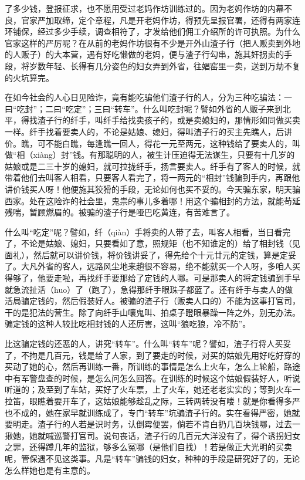 \documentclass[12pt,UTF8]{ctexbook}
\begin{document}
了多少钱，登报征求，也不愿用受过老妈作坊训练过的。因为老妈作坊的内幕不良，官家严加取缔，定个章程，凡是开老妈作坊，得预先呈报官署，还得有两家连环铺保，经过多少手续，调查相符了，才发给他们佣工介绍所的许可执照。为什么官家这样的严厉呢？在从前的老妈作坊很有不少是开外山渣子行（把人贩卖到外地的人贩子）的大本营，遇有好吃懒做的老妈，便与渣子行勾串，施其奸拐卖的手段，将岁数年轻、长得有几分姿色的妇女弄到外省，往娼窑里一卖，送到万劫不复的火坑算完。

在如今社会的人心日见险诈，竟有能吃骗他们渣子行的人，分为三种吃骗法：一曰“吃封”；二曰“吃定”；三曰“转车”。什么叫吃封呢？譬如外省的人贩子来到北平，得找渣子行的纤手，叫纤手给找卖孩子的，或是卖媳妇的，那情形如同做买卖一样。纤手找着要卖人的，不论是姑娘、媳妇，得叫渣子行的买主先瞧人，后讲价。瞧，可不能白瞧，每逢瞧一回人，得花一元至两元，这种钱给了要卖人的，叫做“相（xiàng）封”钱。有那聪明的人，被生计压迫得无法谋生，只要有十几岁的姑娘或是二三十岁的媳妇，就可拉拢纤手，扬言要卖人。纤手有了客人的时候，就带着他们去叫客人相看，只要客人看完了，将一两元的“相封”钱骗到手内，再跟他讲价钱买人呀！他便施其狡猾的手段，无论如何也买不妥的。今天骗东家，明天骗西家。处在这险诈的社会里，鬼祟的事儿多着哪！用这个骗相封的方法，就能苟延残喘，暂顾燃眉的。被骗的渣子行是哑巴吃黄连，有苦难言了。

什么叫“吃定”呢？譬如，纤（qiàn）手将卖的人带了去，叫客人相看，当日看完了，不论是姑娘、媳妇，只要看如了意，照规矩（也不知谁定的）给了相封钱（见面礼），然后就可以讲价钱，将价钱讲妥了，得先给个十元廿元的定钱，算是定妥了。大凡外省的客人，远路风尘地来趟很不容易，绝不能就买一个人呀，多咱人买得够了，他要走啦，再找纤手要那给了定钱的人哪。可是那卖人的将定钱骗到手早就急流扯活（huo）了（跑了），急得那纤手眼珠子都蓝了。还有纤手与卖人的做活局骗定钱的，然后假装好人。被骗的渣子行（贩卖人口的）不能为这事打官司，干的是犯法的营生。除了向纤手山嚷鬼叫、拍桌子瞪眼暴躁一阵之外，别无办法。骗定钱的这种人较比吃相封钱的人还厉害，这叫“狼吃狼，冷不防”。

比这骗定钱的还恶的人，讲究“转车”。什么叫“转车”呢？譬如，渣子行将人买妥了，不拘是几百元，钱是给了人家，到了要走的时候，对买的姑娘先用好吃好穿的买动了她的心，然后再训练一番，所训练的事情是怎么上火车，怎么上轮船，路途中有军警盘查的时候，是怎么问怎么回答。在训练的时候这个姑娘假装好人，听说听道的；及至到了车站，买好了火车票，上了火车，她还老老实实的；等到火车一拉笛，眼瞧着要开车了，这姑娘能够趁乱之际，三转两转没有喽！就是你看得多严也不成的，她在家早就训练成了，专门“转车”坑骗渣子行的。实在看得严密，她就要明走。渣子行的人若是识时务，认倒霉便罢，倘若不肯白扔几百块钱哪，过去一揪她，她就喊巡警打官司。说句丧话，渣子行的几百元大洋没有了，得个诱拐妇女之罪，还得蹲几年的监狱，够多么冤哪（是他们自找）！若是做正大光明的买卖呢，管保遇不见这类事。凡是“转车”骗钱的妇女，种种的手段是研究好了的，无论怎么样她也是有主意的。
\end{document}

